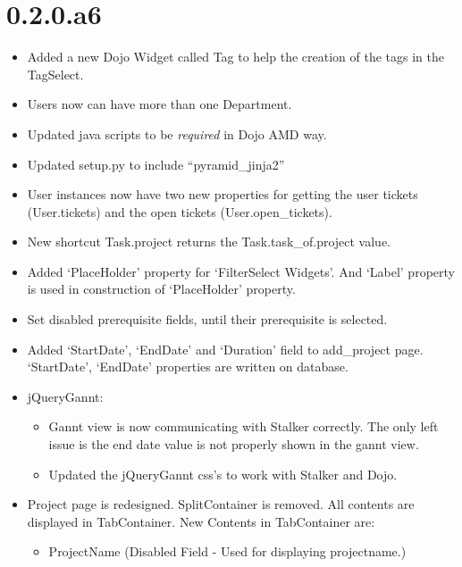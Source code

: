 \documentclass[a4paper,10pt,english]{sphinxmanual}
\begin{document}
\section{0.2.0.a6}
\label{changelog:a6}\begin{itemize}
\item {} 
Added a new Dojo Widget called Tag to help the creation of the tags in the
TagSelect.

\item {} 
Users now can have more than one Department.

\item {} 
Updated java scripts to be \emph{required} in Dojo AMD way.

\item {} 
Updated setup.py to include ``pyramid\_jinja2''

\item {} 
User instances now have two new properties for getting the user tickets
(User.tickets) and the open tickets (User.open\_tickets).

\item {} 
New shortcut Task.project returns the Task.task\_of.project value.

\item {} 
Added `PlaceHolder' property for `FilterSelect Widgets'. And `Label' property
is used in construction of `PlaceHolder' property.

\item {} 
Set disabled prerequisite fields, until their prerequisite is selected.

\item {} 
Added `StartDate', `EndDate' and `Duration' field to add\_project page.
`StartDate', `EndDate' properties are written on database.

\item {} 
jQueryGannt:
\begin{itemize}
\item {} 
Gannt view is now communicating with Stalker correctly. The only left issue
is the end date value is not properly shown in the gannt view.

\item {} 
Updated the jQueryGannt css's to work with Stalker and Dojo.

\end{itemize}

\item {} 
Project page is redesigned. SplitContainer is removed. All contents are
displayed in TabContainer. New Contents in TabContainer are:
\begin{itemize}
\item {} 
ProjectName (Disabled Field - Used for displaying projectname.)


\end{itemize}
\end{itemize}
\end{document}
